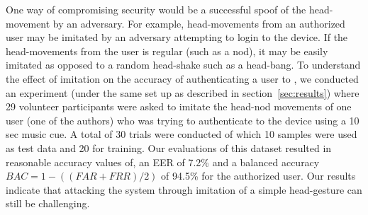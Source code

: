 One way of compromising security would be a successful spoof of the 
head-movement by an adversary. For example, head-movements from an authorized 
user may be imitated by an adversary attempting to login to the device. 
If the head-movements from the user is regular (such as a nod), it may be 
easily imitated as opposed to a random head-shake such as a head-bang.
To understand the effect of imitation on the accuracy of authenticating a user 
to \systemname, we conducted an experiment (under the same set up as  
described in section~\ref{sec:results}) where 29 volunteer participants 
were asked to imitate the head-nod movements of one user (one of the authors) 
who was trying to authenticate to the device using a 10 sec music cue. A total 
of 30 trials were conducted of which 10 samples were used as test data and 20 
for training. Our evaluations of this dataset resulted in reasonable accuracy 
values of, an 
EER of 7.2\% and a balanced 
accuracy $BAC = 1 - ((FAR+FRR)/2)$ of 94.5\% for the authorized user. Our 
results indicate that attacking the system through imitation of a simple 
head-gesture can still be challenging.


